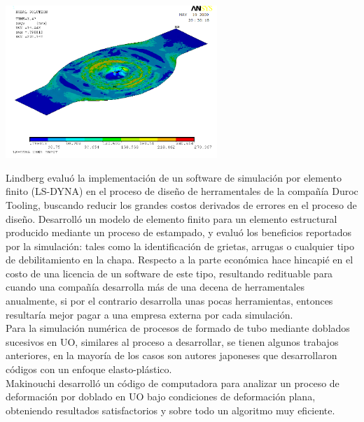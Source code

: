 \begin{center}
\includegraphics[width=0.6\textwidth]{src/ch1/garcia2009.png}
\label{fig:garcia2009}
\end{center}

Lindberg \cite{lindberg2012} evaluó la implementación de un software de simulación por elemento finito 
(LS-DYNA) en el proceso de diseño de herramentales de la compañía Duroc Tooling, buscando
reducir los grandes costos derivados de errores en el proceso de diseño. Desarrolló un modelo
de elemento finito para un elemento estructural producido mediante un proceso de estampado, 
y evaluó los beneficios reportados por la simulación: tales como la identificación de grietas,
arrugas o cualquier tipo de debilitamiento en la chapa. Respecto a la parte económica hace
hincapié en el costo de una licencia de un software de este tipo, resultando redituable para 
cuando una compañía desarrolla más de una decena de herramentales anualmente, si por el
contrario desarrolla unas pocas herramientas, entonces resultaría mejor pagar a una empresa
externa por cada simulación.\\

Para la simulación numérica de procesos de formado de tubo mediante doblados sucesivos en UO, 
similares al proceso a desarrollar, se tienen algunos trabajos anteriores, en la mayoría de los 
casos son autores japoneses que desarrollaron códigos con un enfoque elasto-plástico.\\

Makinouchi \cite{makinouchi1989} desarrolló un código de computadora para analizar un proceso 
de deformación por doblado en UO bajo condiciones de deformación plana, obteniendo resultados 
satisfactorios y sobre todo un algoritmo muy eficiente.\\

